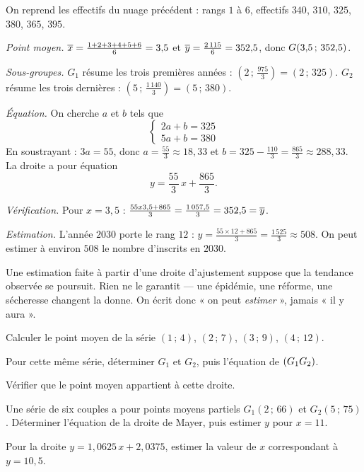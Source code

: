 \begin{exemple}
On reprend les effectifs du nuage précédent : rangs $1$ à $6$, effectifs
$340$, $310$, $325$, $380$, $365$, $395$.

\emph{Point moyen.} $\overline{x} = \frac{1+2+3+4+5+6}{6} = 3{,}5$ et
$\overline{y} = \frac{2\,115}{6} = 352{,}5$, donc
$G(3{,}5\,;\,352{,}5)$.

\emph{Sous-groupes.} $G_{1}$ résume les trois premières années :
$\left(2\,;\,\frac{975}{3}\right) = (2\,;\,325)$. $G_{2}$ résume les trois
dernières : $\left(5\,;\,\frac{1\,140}{3}\right) = (5\,;\,380)$.

\emph{Équation.} On cherche $a$ et $b$ tels que
\[
  \begin{cases} 2a+b = 325\\ 5a+b = 380 \end{cases}
\]
En soustrayant : $3a = 55$, donc $a = \frac{55}{3} \approx 18{,}33$ et
$b = 325-\frac{110}{3} = \frac{865}{3} \approx 288{,}33$. La droite a pour
équation
\[
  y = \frac{55}{3}\,x+\frac{865}{3} .
\]

\emph{Vérification.} Pour $x = 3{,}5$ :
$\frac{55x3{,}5+865}{3} = \frac{1\,057{,}5}{3} = 352{,}5 = \overline{y}$.
\checkmark

\emph{Estimation.} L'année $2030$ porte le rang $12$ :
$y = \frac{55\times12+865}{3} = \frac{1\,525}{3} \approx 508$. On peut
estimer à environ $508$ le nombre d'inscrits en $2030$.
\end{exemple}

\begin{avertissement}
Une estimation faite à partir d'une droite d'ajustement suppose que la
tendance observée se poursuit. Rien ne le garantit — une épidémie, une
réforme, une sécheresse changent la donne. On écrit donc « on peut
\emph{estimer} », jamais « il y aura ».
\end{avertissement}

\begin{entrainement}
\exo[\niveau{1}] Calculer le point moyen de la série
$(1\,;\,4)$, $(2\,;\,7)$, $(3\,;\,9)$, $(4\,;\,12)$.

\exo[\niveau{2}] Pour cette même série, déterminer $G_{1}$ et $G_{2}$, puis
l'équation de $(G_{1}G_{2})$.

\exo[\niveau{2}] Vérifier que le point moyen appartient à cette droite.

\exo[\niveau{3}] Une série de six couples a pour points moyens partiels
$G_{1}(2\,;\,66)$ et $G_{2}(5\,;\,75)$. Déterminer l'équation de la droite
de Mayer, puis estimer $y$ pour $x = 11$.

\exo[\niveau{3}] Pour la droite $y = 1{,}0625\,x+2{,}0375$, estimer la
valeur de $x$ correspondant à $y = 10{,}5$.
\end{entrainement}

